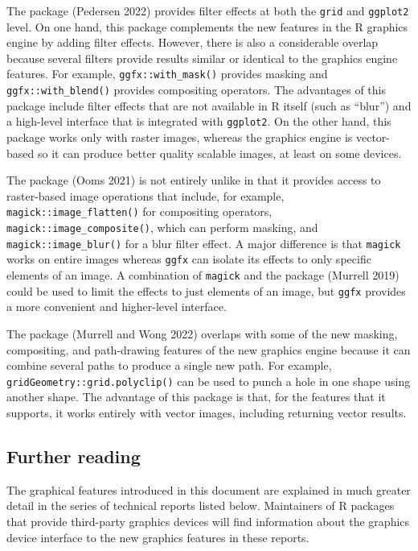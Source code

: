 The  package (Pedersen 2022) provides filter effects
at both the \texttt{grid} and \texttt{ggplot2} level.
On one hand, this package complements the new features in the R graphics
engine by adding filter effects.
However, there is also a considerable overlap because several filters
provide results similar or identical to the graphics engine features.
For example,
\texttt{ggfx::with\_mask()} provides masking and \texttt{ggfx::with\_blend()} provides
compositing operators.
The advantages of this package include filter effects that are
not available in R itself (such as ``blur'') and a high-level interface
that is integrated with \texttt{ggplot2}.
On the other hand, this package works only with raster images,
whereas the graphics engine is vector-based
so it can produce better quality scalable images, at least on
some devices.

The  package (Ooms 2021) is not entirely unlike
 in that it provides access to raster-based image
operations that include, for example,
\texttt{magick::image\_flatten()} for compositing
operators, \texttt{magick::image\_composite()}, which can perform masking,
and \texttt{magick::image\_blur()} for a blur filter effect.
A major difference is that \texttt{magick} works on entire
images whereas \texttt{ggfx} can isolate its effects to only specific
elements of an image. A combination of \texttt{magick}
and the  package (Murrell 2019) could be used
to limit the effects to just elements of an image, but \texttt{ggfx}
provides a more convenient and higher-level interface.

The  package (Murrell and Wong 2022) overlaps
with some of the new masking, compositing, and path-drawing features
of the new graphics engine because
it can combine several paths to produce a single new path.
For example, \texttt{gridGeometry::grid.polyclip()} can be used to
punch a hole in one shape using another shape.
The advantage of this package is that, for the features that it
supports, it works entirely with
vector images, including returning vector results.

\hypertarget{further-reading}{%
\subsection{Further reading}\label{further-reading}}

The graphical features introduced in this document are explained in much greater
detail in the series of technical reports listed below.
Maintainers of R packages that provide third-party graphics devices
will find information about the graphics device interface to the new
graphics features in these reports.

